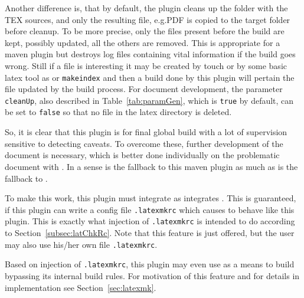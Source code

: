 Another difference is, that by default, the plugin cleans up the folder with the TEX sources, 
and only the resulting file, e.g.\@ PDF is copied to the target folder before cleanup. 
To be more precise, only the files present before the build are kept, possibly updated, 
all the others are removed. 
This is appropriate for a maven plugin but destroys log files containing vital information 
if the build goes wrong. 
Still if a file is interesting it may be created by touch or by some basic latex tool 
as \lualatex{} or \texttt{makeindex} 
and then a build done by this plugin will pertain the file updated by the build process. 
For document development, 
the parameter \texttt{cleanUp}, also described in Table~\ref{tab:paramGen}, 
which is \texttt{true} by default, can be set to \texttt{false} 
so that no file in the latex directory is deleted. 

So, it is clear that this plugin is for final global build with a lot of supervision 
sensitive to detecting caveats. 
To overcome these, further development of the document is necessary, 
which is better done individually on the problematic document with . 
In a sense  is the fallback to this maven plugin 
as much as \lualatex{} is the fallback to . 

To make this work, this plugin must integrate  
as  integrates \lualatex{}. 
This is guaranteed, if this plugin can write a config file \texttt{.latexmkrc} 
which causes  to behave like this plugin. 
This is exactly what injection of \texttt{.latexmkrc} is intended to do 
according to Section~\ref{subsec:latChkRc}. 
Note that this feature is just offered, 
but the user may also use his/her own file \texttt{.latexmkrc}. 

Based on injection of \texttt{.latexmkrc}, this plugin may even use  
as a means to build bypassing its internal build rules. 
For motivation of this feature and for details in implementation see Section~\ref{sec:latexmk}. 

